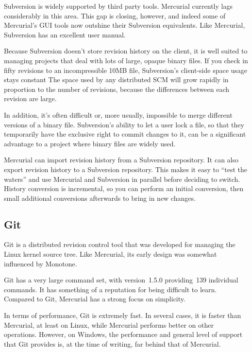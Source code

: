 Subversion is widely supported by third party tools.  Mercurial
currently lags considerably in this area.  This gap is closing,
however, and indeed some of Mercurial's GUI tools now outshine their
Subversion equivalents.  Like Mercurial, Subversion has an excellent
user manual.

Because Subversion doesn't store revision history on the client, it is
well suited to managing projects that deal with lots of large, opaque
binary files.  If you check in fifty revisions to an incompressible
10MB file, Subversion's client-side space usage stays constant The
space used by any distributed SCM will grow rapidly in proportion to
the number of revisions, because the differences between each revision
are large.

In addition, it's often difficult or, more usually, impossible to
merge different versions of a binary file.  Subversion's ability to
let a user lock a file, so that they temporarily have the exclusive
right to commit changes to it, can be a significant advantage to a
project where binary files are widely used.

Mercurial can import revision history from a Subversion repository.
It can also export revision history to a Subversion repository.  This
makes it easy to ``test the waters'' and use Mercurial and Subversion
in parallel before deciding to switch.  History conversion is
incremental, so you can perform an initial conversion, then small
additional conversions afterwards to bring in new changes.


\subsection{Git}

Git is a distributed revision control tool that was developed for
managing the Linux kernel source tree.  Like Mercurial, its early
design was somewhat influenced by Monotone.

Git has a very large command set, with version~1.5.0 providing~139
individual commands.  It has something of a reputation for being
difficult to learn.  Compared to Git, Mercurial has a strong focus on
simplicity.

In terms of performance, Git is extremely fast.  In several cases, it
is faster than Mercurial, at least on Linux, while Mercurial performs
better on other operations.  However, on Windows, the performance and
general level of support that Git provides is, at the time of writing,
far behind that of Mercurial.

